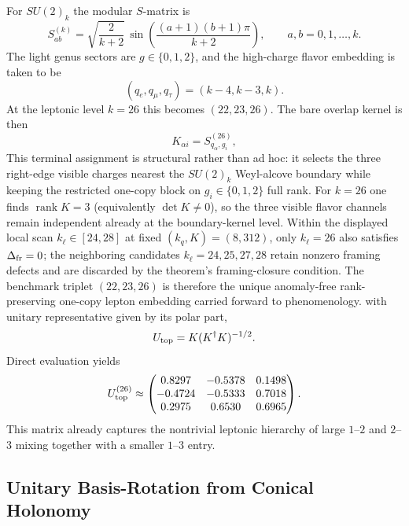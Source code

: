 \documentclass[11pt]{article}
\begin{document}
For $SU(2)_k$ the modular $S$-matrix is
\begin{equation}
 S_{ab}^{(k)} = \sqrt{\frac{2}{k+2}}\,\sin\!\left(\frac{(a+1)(b+1)\pi}{k+2}\right),
 \qquad a,b=0,1,\dots,k.
\end{equation}
The light genus sectors are $g\in\{0,1,2\}$, and the high-charge flavor embedding is taken to be
\begin{equation}
 (q_e,q_{\mu},q_{\tau}) = (k-4,k-3,k).
\end{equation}
At the leptonic level $k=26$ this becomes $(22,23,26)$. The bare overlap kernel is then
\begin{equation}
 K_{\alpha i}=S^{(26)}_{q_{\alpha},g_i},
\end{equation}
This terminal assignment is structural rather than ad hoc: it selects the three right-edge visible charges nearest the $SU(2)_k$ Weyl-alcove boundary while keeping the restricted one-copy block on $g_i\in\{0,1,2\}$ full rank. For $k=26$ one finds $\operatorname{rank}K=3$ (equivalently $\det K\neq0$), so the three visible flavor channels remain independent already at the boundary-kernel level. Within the displayed local scan $k_{\ell}\in[24,28]$ at fixed $(k_q,K)=(8,312)$, only $k_{\ell}=26$ also satisfies $\Delta_{\rm fr}=0$; the neighboring candidates $k_{\ell}=24,25,27,28$ retain nonzero framing defects and are discarded by the theorem's framing-closure condition. The benchmark triplet $(22,23,26)$ is therefore the unique anomaly-free rank-preserving one-copy lepton embedding carried forward to phenomenology.
with unitary representative given by its polar part,
\begin{equation}
 U_{\rm top}=K(K^{\dagger}K)^{-1/2}.
\end{equation}
Direct evaluation yields
\begin{equation}
 U_{\rm top}^{(26)}\approx
 \begin{pmatrix}
 0.8297 & -0.5378 & 0.1498 \\
 -0.4724 & -0.5333 & 0.7018 \\
 0.2975 & 0.6530 & 0.6965
 \end{pmatrix}.
\end{equation}
This matrix already captures the nontrivial leptonic hierarchy of large $1$--$2$ and $2$--$3$ mixing together with a smaller $1$--$3$ entry.

\subsection{Unitary Basis-Rotation from Conical Holonomy}
\end{document}
